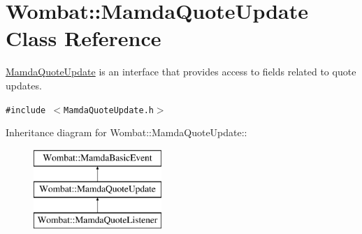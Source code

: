 \hypertarget{classWombat_1_1MamdaQuoteUpdate}{
\section{Wombat::Mamda\-Quote\-Update Class Reference}
\label{classWombat_1_1MamdaQuoteUpdate}
}
\hyperlink{classWombat_1_1MamdaQuoteUpdate}{Mamda\-Quote\-Update} is an interface that provides access to fields related to quote updates.  


{\tt \#include $<$Mamda\-Quote\-Update.h$>$}

Inheritance diagram for Wombat::Mamda\-Quote\-Update::\begin{figure}[H]
\begin{center}
\leavevmode
\includegraphics[height=3cm]{classWombat_1_1MamdaQuoteUpdate}
\end{center}
\end{figure}
